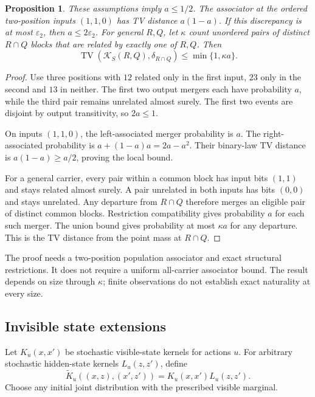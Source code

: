 \documentclass[11pt,letterpaper]{article}
\newtheorem{proposition}[theorem]{Proposition}
\newcommand{\TV}{\operatorname{TV}}
\begin{document}
\begin{proposition}
These assumptions imply \(a\le1/2\). The associator at the ordered
two-position inputs \((1,1,0)\) has TV distance \(a(1-a)\).
If this discrepancy is at most \(\varepsilon_2\), then
\(a\le2\varepsilon_2\).
For general \(R,Q\), let \(\kappa\) count unordered pairs of distinct
\(R\cap Q\) blocks that are related by exactly one of \(R,Q\). Then
\[
 \TV(\mathcal K_S(R,Q),\delta_{R\cap Q})
 \le\min\{1,\kappa a\}.
\]
\end{proposition}
\begin{proof}
Use three positions with \(12\) related only in the first input, \(23\)
only in the second and \(13\) in neither. The first two output mergers
each have probability \(a\), while the third pair remains unrelated
almost surely. The first two events are disjoint by output transitivity,
so \(2a\le1\).

On inputs \((1,1,0)\), the left-associated merger probability is \(a\).
The right-associated probability is \(a+(1-a)a=2a-a^2\).
Their binary-law TV distance is \(a(1-a)\ge a/2\), proving the local bound.

For a general carrier, every pair within a common block has input bits
\((1,1)\) and stays related almost surely. A pair unrelated in both inputs
has bits \((0,0)\) and stays unrelated. Any departure from \(R\cap Q\)
therefore merges an eligible pair of distinct common blocks. Restriction
compatibility gives probability \(a\) for each such merger. The union
bound gives probability at most \(\kappa a\) for any departure.
This is the TV distance from the point mass at \(R\cap Q\).
\end{proof}

The proof needs a two-position population associator and exact structural
restrictions. It does not require a uniform all-carrier associator bound.
The result depends on size through \(\kappa\); finite observations do not
establish exact naturality at every size.

\subsection{Invisible state extensions}

Let \(K_u(x,x')\) be stochastic visible-state kernels for actions \(u\).
For arbitrary stochastic hidden-state kernels \(L_u(z,z')\), define
\[
 \widetilde K_u((x,z),(x',z'))=K_u(x,x')L_u(z,z').
\]
Choose any initial joint distribution with the prescribed visible marginal.
\end{document}
